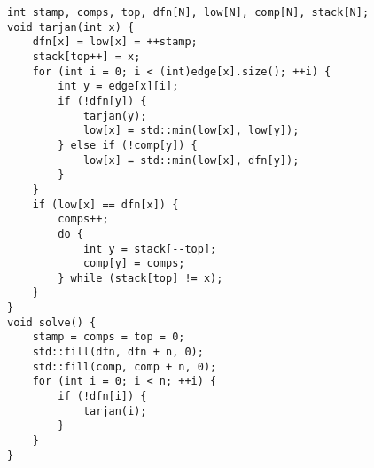 \begin{lstlisting}
int stamp, comps, top, dfn[N], low[N], comp[N], stack[N];
void tarjan(int x) {
    dfn[x] = low[x] = ++stamp;
    stack[top++] = x;
    for (int i = 0; i < (int)edge[x].size(); ++i) {
        int y = edge[x][i];
        if (!dfn[y]) {
            tarjan(y);
            low[x] = std::min(low[x], low[y]);
        } else if (!comp[y]) {
            low[x] = std::min(low[x], dfn[y]);
        }
    }
    if (low[x] == dfn[x]) {
        comps++;
        do {
            int y = stack[--top];
            comp[y] = comps;
        } while (stack[top] != x);
    }
}
void solve() {
    stamp = comps = top = 0;
    std::fill(dfn, dfn + n, 0);
    std::fill(comp, comp + n, 0);
    for (int i = 0; i < n; ++i) {
        if (!dfn[i]) {
            tarjan(i);
        }
    }
}
\end{lstlisting}
